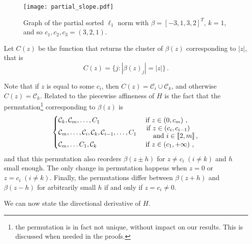 \begin{figure}[htbp]
  \centering
  \texttt{[image: partial\_slope.pdf]}
  \caption{Graph of the partial sorted $\ell_1$ norm with \(\beta = [-3, 1, 3, 2]^T\), \(k = 1\), and so $c_1, c_2, c_3 = (3, 2, 1)$.}
  \label{fig:partial_slope}
\end{figure}

Let \(C(z)\) be the function that returns the cluster of $\beta(z)$ corresponding to \(|z|\), that is
\begin{equation}
  C(z) = \{j : |\beta(z)_j| = |z|\} \,.
\end{equation}

\begin{remark}\label{rem:permutation_C_z}
  Note that if $z$ is equal to some $c_i$, then $C(z) = \mathcal{C}_i \cup \mathcal{C}_k$, and otherwise $C(z) = \mathcal{C}_k$.
  Related to the piecewise affineness of $H$ is the fact that the permutation\footnote{the permutation is in fact not unique, without impact on our results. This is discussed when needed in the proofs.} corresponding to $\beta(z)$ is
  \begin{equation*}
    \begin{cases}
      \cC_k, \cC_m, \ldots, C_1
       & \text{ if } z \in \left(0, c_m\right) \, ,                                                                     \\
      \cC_m, \ldots ,\cC_i, \cC_k, \cC_{i-1}, \ldots, C_1
       & \splitfrac{\text{ if } z \in \left(c_{i}, c_{i-1} \right)}{\text{ and } i \in \llbracket 2 , m \rrbracket\, ,} \\
      \cC_m, \ldots C_1,  \cC_k
       & \text{ if } z \in \left(c_1, +\infty \right) \, ,                                                              \\
    \end{cases}
  \end{equation*}
  and that this permutation also reorders $\beta(z \pm h)$ for $z \neq c_i \; (i \neq k)$ and $h$ small enough.
  The only change in permutation happens when $z = 0$ or $z = c_i \; (i \neq k)$.
  Finally, the permutations differ between $\beta(z + h)$ and $\beta(z - h)$ for arbitrarily small $h$ if and only if $z = c_i \neq 0$.
\end{remark}

We can now state the directional derivative of $H$.

